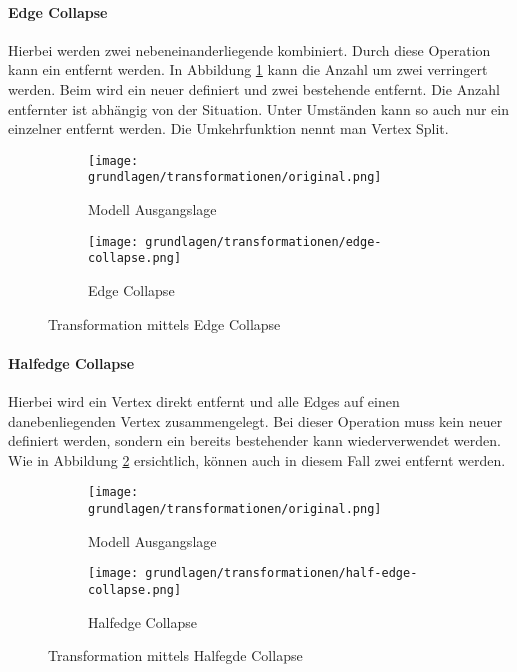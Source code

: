 \paragraph{Edge Collapse}
Hierbei werden zwei nebeneinanderliegende  kombiniert. Durch diese Operation kann ein  entfernt werden. In Abbildung \ref{fig:transformationEdgeCollapse} kann die Anzahl  um zwei verringert werden. Beim  wird ein neuer  definiert und zwei bestehende entfernt. Die Anzahl entfernter  ist abhängig von der Situation. Unter Umständen kann so auch nur ein einzelner  entfernt werden.
Die Umkehrfunktion nennt man Vertex Split.

\begin{figure}[H]
  \centering
  \begin{subfigure}{.5\textwidth}
    \centering
    \texttt{[image: grundlagen/transformationen/original.png]}
    \caption{Modell Ausgangslage}
  \end{subfigure}%
  \begin{subfigure}{.5\textwidth}
    \centering
    \texttt{[image: grundlagen/transformationen/edge-collapse.png]}
    \caption{Edge Collapse}
  \end{subfigure}
  \caption{Transformation mittels Edge Collapse}
  \label{fig:transformationEdgeCollapse}
\end{figure}

\paragraph{Halfedge Collapse}
Hierbei wird ein Vertex direkt entfernt und alle Edges auf einen danebenliegenden Vertex zusammengelegt. Bei dieser Operation muss kein neuer  definiert werden, sondern ein bereits bestehender  kann wiederverwendet werden. Wie in Abbildung \ref{fig:transformationHalfedgeCollapse} ersichtlich, können auch in diesem Fall zwei  entfernt werden.

\begin{figure}[H]
  \centering
  \begin{subfigure}{.5\textwidth}
    \centering
    \texttt{[image: grundlagen/transformationen/original.png]}
    \caption{Modell Ausgangslage}
  \end{subfigure}%
  \begin{subfigure}{.5\textwidth}
    \centering
    \texttt{[image: grundlagen/transformationen/half-edge-collapse.png]}
    \caption{Halfedge Collapse}
  \end{subfigure}
  \caption{Transformation mittels Halfegde Collapse}
  \label{fig:transformationHalfedgeCollapse}
\end{figure}

